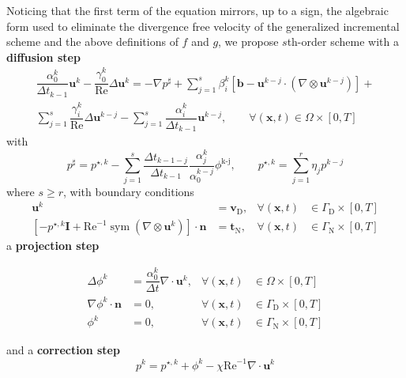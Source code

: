 \documentclass[]{scrartcl}
\newcommand{\bs}[1]{\boldsymbol{#1}}
\DeclareMathOperator{\Sym}{sym}
\begin{document}
Noticing that the first term of the equation mirrors, up to a sign, the algebraic form used to eliminate the divergence free velocity of the generalized incremental scheme and the above definitions of $f$ and $g$, we propose $s$th-order scheme with a \textbf{diffusion step}
\begin{equation}
\begin{split}\label{Eqn:VSIMEXDiffusionStep}
	\dfrac{\alpha_0^k}{\Delta t_{k-1}} \bs{u}^{k} -\dfrac{\gamma_0^k}{\textrm{Re}} \Delta \bs{u}^{k} = -\nabla p^{\sharp} + \sum_{j=1}^{s} \beta_i^k \left[ \bs{b} - \bs{u}^{k-j} \cdot (\nabla \otimes \bs{u}^{k-j})\right] + \\
	\sum_{j=1}^{s} \dfrac{\gamma_i^k}{\textrm{Re}} \Delta \bs{u}^{k-j} -   \sum_{j=1}^{s} \dfrac{\alpha_i^k}{\Delta t_{k-1}}\bs{u}^{k-j}, \qquad \forall(\bs{x},t)\in \Omega \times [0, T]
\end{split}
\end{equation}
with
\begin{equation*}
	 p^\sharp = p^{\star, k} - \sum_{j=1}^{s} \frac{\Delta t_{k-1-j}}{\Delta t_{k-1}}          \frac{\alpha_j^k}{\alpha_0^{k-j}}\phi^\textrm{k-j} ,
	 \qquad
	 p^{\star, k} = \sum_{j=1}^{r} \eta_j p^{k-j}
\end{equation*}
where $s\ge r$, with boundary conditions
\begin{equation*}
	\begin{aligned}
		\bs{u}^{k} &= \bs{v}_\textrm{D}, &\forall(\bs{x}, t) &\in \Gamma_\textrm{D} \times [0, T] \\
		[- p^{\star, k} \bs{I} + \textrm{Re}^{-1} \Sym (\nabla \otimes \bs{u}^{k})] \cdot \bs{n} &= \bs{t}_\textrm{N},  &\forall(\bs{x}, t) &\in \Gamma_\textrm{N} \times [0, T]
	\end{aligned}
\end{equation*}
a \textbf{projection step}

\begin{align}
\Delta \phi^{k} &= \dfrac{\alpha_0^k}{\Delta t} \nabla \cdot \bs{u}^{k},  &\forall (\bs{x}, t) &\in \Omega \times \left[0, T \right] \label{Eqn:VSIMEXProjectionStep} \\
\nabla \phi^{k} \cdot \bs{n} &= 0, &\forall (\bs{x}, t) &\in \Gamma_\textrm{D} \times \left[0, T \right] \nonumber \\
\phi^{k} &= 0, &\forall\left(\bs{x}, t\right) &\in \Gamma_\textrm{N} \times \left[0, T \right] \nonumber
\end{align}

and a \textbf{correction step}
\begin{equation}\label{Eqn:VSIMEXCorrectionStep}
	p^{k} = p^{\star, k} + \phi^{k} - \chi\textrm{Re}^{-1} \nabla \cdot \bs{u}^{k}
\end{equation}
\end{document}
